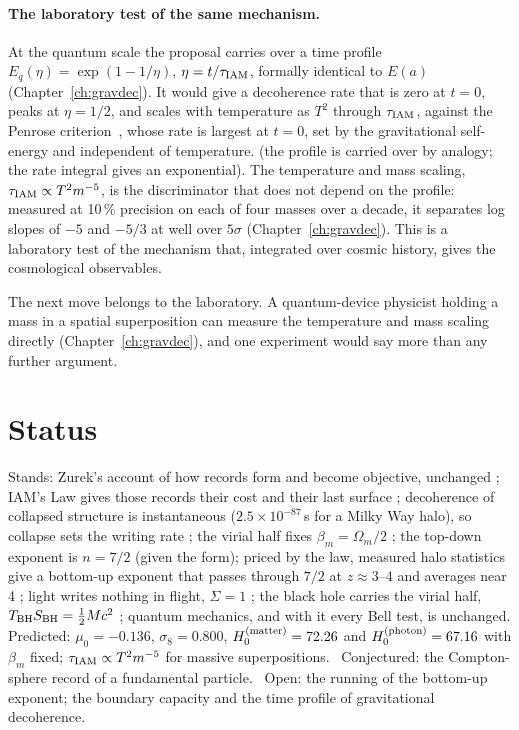 \paragraph{The laboratory test of the same mechanism.} At the quantum scale the proposal carries over a time profile $E_q(\eta)=\exp(1-1/\eta)$,
$\eta=t/\tau_{\rm IAM}$, formally identical to $E(a)$ (Chapter~\ref{ch:gravdec}). It would give a decoherence rate that is zero at $t=0$, peaks at
$\eta=1/2$, and scales with temperature as $T^2$ through $\tau_{\rm IAM}$, against the Penrose criterion~\cite{Penrose1996}, whose rate is largest at $t=0$,
set by the gravitational self-energy and independent of temperature. \conjecture{} (the profile is carried over by analogy; the rate integral gives an
exponential). The temperature and mass scaling, $\tau_{\rm IAM}\propto T^2m^{-5}$, is the discriminator that does not depend on the profile: measured at
10\,\% precision on each of four masses over a decade, it separates log slopes of $-5$ and $-5/3$ at well over $5\sigma$ (Chapter~\ref{ch:gravdec}).
\prediction{} This is a laboratory test of the mechanism that, integrated over cosmic history, gives the cosmological observables.

The next move belongs to the laboratory. A quantum-device physicist holding a mass in a spatial superposition can measure the temperature and mass scaling directly (Chapter~\ref{ch:gravdec}), and one experiment would say more than any further argument.

\section{Status}
Stands: Zurek's account of how records form and become objective, unchanged \derived; IAM's Law gives those records their cost and their last surface
\interp; decoherence of collapsed structure is instantaneous ($2.5\times10^{-87}$\,s for a Milky Way halo), so collapse sets the writing rate \calc; the
virial half fixes $\beta_m=\Omega_m/2$ \derived; the top-down exponent is $n=7/2$ \derived{} (given the form); priced by the law, measured halo statistics give a bottom-up
exponent that passes through $7/2$ at $z\approx3$--$4$ and averages near 4 \calc; light writes nothing in flight, $\Sigma=1$ \derived; the black hole
carries the virial half, $T_{\rm BH}S_{\rm BH}=\tfrac12Mc^2$ \derived; quantum mechanics, and with it every Bell test, is unchanged. Predicted:
$\mu_0=-0.136$, $\sigma_8=0.800$, $H_0^{(\rm matter)}=72.26$ and $H_0^{(\rm photon)}=67.16$ with $\beta_m$ fixed; $\tau_{\rm IAM}\propto T^2m^{-5}$ for
massive superpositions. \prediction\ Conjectured: the Compton-sphere record of a fundamental particle. \conjecture\ Open: the running of the bottom-up
exponent; the boundary capacity and the time profile of gravitational decoherence. \openprob
